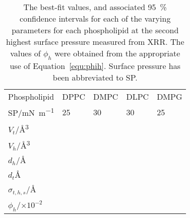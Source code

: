 \begin{table}
    \centering
    \small
    \caption{The best-fit values, and associated \SI{95}{\percent} confidence intervals for each of the varying parameters for each phospholipid at the second highest surface pressure measured from XRR. The values of $\phi_h$ were obtained from the appropriate use of Equation~\protect\ref{equ:phih}. Surface pressure has been abbreviated to SP.}
    \label{tab:xrrref3}
    \begin{tabular}{l | l l l l}
        \toprule
        Phospholipid & DPPC & DMPC & DLPC & DMPG \\
        SP/\si{\milli\newton\per\meter} & 25 & 30 & 30 & 25 \\
        \midrule
        $V_t$/\si{\angstrom\cubed} &  &  &  &  \\
        $V_h$/\si{\angstrom\cubed} &  &  &  &  \\
        $d_h$/\si{\angstrom} &  &  &  &  \\
        \midrule
        $d_t$\si{\angstrom} &  &  &  &  \\
        $\sigma_{t,h,s}$/\si{\angstrom} &  &  &  &  \\
        \midrule
        $\phi_h$/$\times 10^{-2}$ &  &  &  &  \\
        \bottomrule
    \end{tabular}
\end{table}
%

